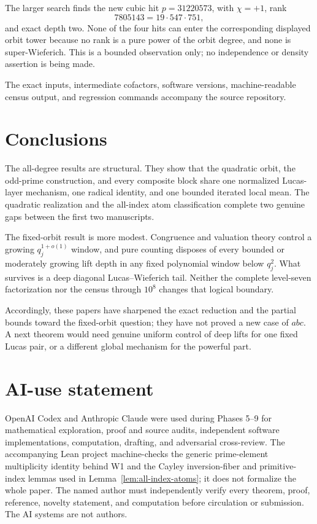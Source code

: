 \documentclass[11pt]{article}
\theoremstyle{definition}
\theoremstyle{remark}
\begin{document}
The larger search finds the new cubic hit \(p=31220573\), with
\(\chi=+1\), rank
\[
 7805143=19\cdot547\cdot751,
\]
and exact depth two.  None of the four hits can enter the corresponding
displayed orbit tower because no rank is a pure power of the orbit degree,
and none is super-Wieferich.  This is a bounded observation only; no
independence or density assertion is being made.

The exact inputs, intermediate cofactors, software versions, machine-readable
census output, and regression commands accompany the source repository.

\section{Conclusions}

The all-degree results are structural.  They show that the quadratic orbit,
the odd-prime construction, and every composite block share one normalized
Lucas-layer mechanism, one radical identity, and one bounded iterated local
mean.  The quadratic realization and the all-index atom classification
complete two genuine gaps between the first two manuscripts.

The fixed-orbit result is more modest.  Congruence and valuation theory
control a growing \(q_j^{1+o(1)}\) window, and pure counting disposes of
every bounded or moderately growing lift depth in any fixed polynomial
window below \(q_j^2\).  What survives is a deep diagonal
Lucas--Wieferich tail.  Neither the complete level-seven factorization nor
the census through \(10^8\) changes that logical boundary.

Accordingly, these papers have sharpened the exact reduction and the
partial bounds toward the fixed-orbit question; they have not proved a new
case of \(abc\).  A next theorem would need genuine uniform control of deep
lifts for one fixed Lucas pair, or a different global mechanism for the
powerful part.

\section{AI-use statement}

OpenAI Codex and Anthropic Claude were used during Phases 5--9 for
mathematical exploration, proof and source audits, independent software
implementations, computation, drafting, and adversarial cross-review.  The
accompanying Lean project machine-checks the generic prime-element
multiplicity identity behind W1 and the Cayley inversion-fiber and
primitive-index lemmas used in Lemma~\ref{lem:all-index-atoms}; it does not
formalize the whole paper.  The
named author must independently verify every theorem, proof, reference,
novelty statement, and computation before circulation or submission.  The
AI systems are not authors.
\end{document}

